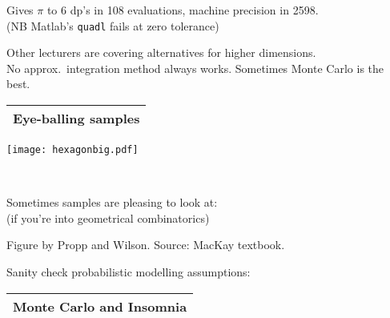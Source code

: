 \documentclass[25pt,landscape]{foils}
\newcommand{\Gray}{\textcolor{mygray}}
\newcommand{\myfoilhead}[1]{
\newpage
\vspace*{-1cm}
\Gray{
\begin{tabular*}{\textwidth}{l}
{\bf \Huge #1} \\
\bottomrule
\end{tabular*}}}
\begin{document}
\bigskip

Gives $\pi$ to 6 dp's in 108 evaluations, machine precision in 2598.\\
\Gray{\small (NB Matlab's \texttt{quadl} fails at zero tolerance)}

\vfill

Other lecturers are covering alternatives for higher dimensions.\\
{\small No approx.\ integration method always works. Sometimes Monte Carlo is the best.}

\myfoilhead{Eye-balling samples}

\begin{minipage}{0.34\linewidth}
\texttt{[image: hexagonbig.pdf]}
\end{minipage}~~~
\begin{minipage}{0.7\linewidth}
Sometimes samples are pleasing to look at:\\
{\small (if you're into geometrical combinatorics)}

\vspace*{2cm}
\Gray{\small Figure by Propp and Wilson. Source: MacKay textbook.}
\end{minipage}

\vfill

Sanity check probabilistic modelling assumptions:

\begin{center}
\end{center}

\vspace*{-0.7cm}

\myfoilhead{Monte Carlo and Insomnia}
\end{document}
